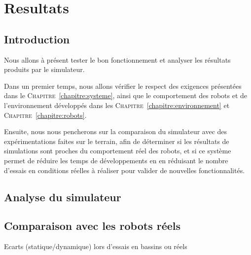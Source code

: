 \chapter{Resultats}
	
	\section{Introduction}

		Nous allons à présent tester le bon fonctionnement et analyser les résultats produits par le simulateur.
		
		Dans un premier temps, nous allons vérifier le respect des exigences présentées dans le \textsc{Chapitre}~\ref{chapitre:systeme}, ainsi que le comportement des robots et de l'environnement développés dans les \textsc{Chapitre}~\ref{chapitre:environnement} et \textsc{Chapitre}~\ref{chapitre:robots}.

		Ensuite, nous nous pencherons sur la comparaison du simulateur avec des expérimentations faites sur le terrain, afin de déterminer si les résultats de simulations sont proches du comportement réel des robots, et si ce système permet de réduire les temps de développements en en réduisant le nombre d'essais en conditions réelles à réaliser pour valider de nouvelles fonctionnalités.

	\section{Analyse du simulateur}

	\section{Comparaison avec les robots réels}

		Ecarts (statique/dynamique) lors d'essais en bassins ou réels
